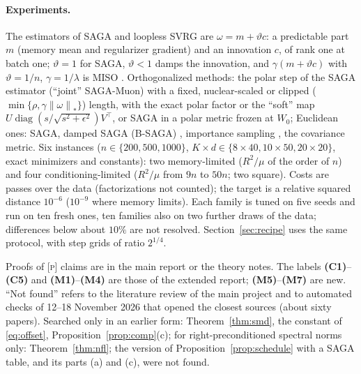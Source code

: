 \documentclass[10pt]{article}
\makeatletter
\renewcommand\subsection{\@startsection{subsection}{2}{\z@}{-1.8ex\@plus -0.5ex \@minus -.2ex}{0.8ex \@plus .2ex}{\normalfont\normalsize\bfseries}}
\theoremstyle{remark}
\newcommand{\nnuc}[1]{\left\|#1\right\|_{*}}
\newcommand{\diag}{\operatorname{diag}}
\newcommand{\finding}[1]{\textbf{(#1)}}
\newcommand{\nat}[1]{\textsc{[#1]}}
\makeatother
\begin{document}
\paragraph{Experiments.}\label{sec:experiments} The estimators of SAGA and loopless SVRG \cite{kovalev2020dont} are
$\omega=m+\vartheta c$: a predictable part $m$ (memory mean and regularizer gradient) and an innovation $c$, of rank one at
batch one; $\vartheta=1$ for SAGA, $\vartheta<1$ damps the innovation, and $\gamma(m+\vartheta c)$ with $\vartheta=1/n$,
$\gamma=1/\lambda$ is MISO \cite{mairal2015incremental}. Orthogonalized methods: the polar step of the SAGA estimator
(``joint'' SAGA-Muon) with a fixed, nuclear-scaled or clipped ($\min\{\rho,\gamma\nnuc\omega\}$) length, with the exact
polar factor or the ``soft'' map $U\diag(s/\sqrt{s^2+\epsilon^2})V^\top$, or SAGA in a polar metric frozen at $W_0$;
Euclidean ones: SAGA, damped SAGA (B-SAGA) \cite{driggs2019biased}, importance sampling \cite{xiao2014proximal}, the
covariance metric. Six instances ($n\in\{200,500,1000\}$, $K\times d\in\{8\times40,10\times50,20\times20\}$, exact
minimizers and constants): two memory-limited ($R^2/\mu$ of the order of $n$) and four conditioning-limited ($R^2/\mu$ from
$9n$ to $50n$; two square). Costs are passes over the data (factorizations not counted); the target is a relative
squared distance $10^{-6}$ ($10^{-9}$ where memory limits). Each family is tuned on five seeds and run on ten fresh ones,
ten families also on two further draws of the data; differences below about $10\%$ are not resolved.
Section~\ref{sec:recipe} uses the same protocol, with step grids of ratio $2^{1/4}$.

\subsection{Status of the claims}\label{sec:status}

Proofs of \nat{p} claims are in the main report or the theory notes. The labels \finding{C1}--\finding{C5} and
\finding{M1}--\finding{M4} are those of the extended report; \finding{M5}--\finding{M7} are new. ``Not found'' refers to
the literature review of the main project and to automated checks of 12--18 November 2026 that opened the closest
sources (about sixty papers). Searched only in an earlier form: Theorem~\ref{thm:smd}, the constant of
\eqref{eq:offset}, Proposition~\ref{prop:comp}(c); for right-preconditioned spectral norms only: Theorem~\ref{thm:nfl};
the version of Proposition~\ref{prop:schedule} with a SAGA table, and its parts (a) and (c), were not found.
\end{document}
